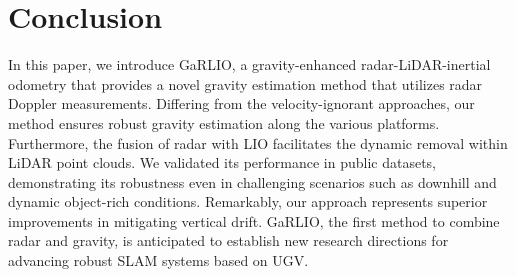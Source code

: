 \section{Conclusion}
\label{sec:conclusion}

In this paper, we introduce GaRLIO, a gravity-enhanced radar-LiDAR-inertial odometry that provides a novel gravity estimation method that utilizes radar Doppler measurements.
Differing from the velocity-ignorant approaches, our method ensures robust gravity estimation along the various platforms.
Furthermore, the fusion of radar with LIO facilitates the dynamic removal within LiDAR point clouds.
We validated its performance in public datasets, demonstrating its robustness even in challenging scenarios such as downhill and dynamic object-rich conditions.
Remarkably, our approach represents superior improvements in mitigating vertical drift. GaRLIO, the first method to combine radar and gravity,  is anticipated to establish new research directions for advancing robust SLAM systems based on \ac{UGV}.






